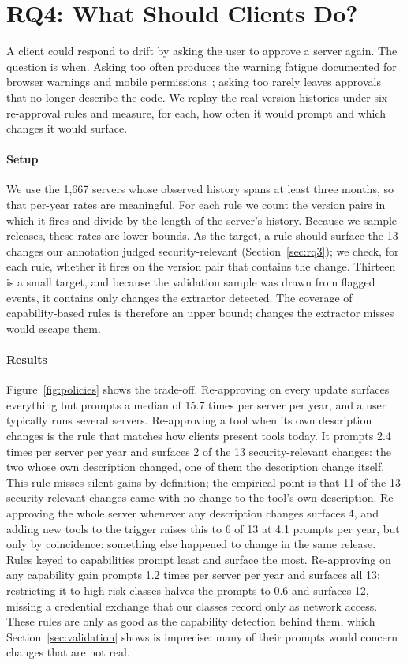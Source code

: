 \section{RQ4: What Should Clients Do?}\label{sec:rq4}

A client could respond to drift by asking the user to approve a server again. The question is when. Asking too often produces the warning fatigue documented for browser warnings and mobile permissions~\cite{akhawe2013alice,felt2012android}; asking too rarely leaves approvals that no longer describe the code. We replay the real version histories under six re-approval rules and measure, for each, how often it would prompt and which changes it would surface.

\paragraph{Setup}
We use the 1,667 servers whose observed history spans at least three months, so that per-year rates are meaningful. For each rule we count the version pairs in which it fires and divide by the length of the server's history. Because we sample releases, these rates are lower bounds. As the target, a rule should surface the 13 changes our annotation judged security-relevant (Section~\ref{sec:rq3}); we check, for each rule, whether it fires on the version pair that contains the change. Thirteen is a small target, and because the validation sample was drawn from flagged events, it contains only changes the extractor detected. The coverage of capability-based rules is therefore an upper bound; changes the extractor misses would escape them.

\paragraph{Results}
Figure~\ref{fig:policies} shows the trade-off. Re-approving on every update surfaces everything but prompts a median of 15.7 times per server per year, and a user typically runs several servers. Re-approving a tool when its own description changes is the rule that matches how clients present tools today. It prompts 2.4 times per server per year and surfaces 2 of the 13 security-relevant changes: the two whose own description changed, one of them the description change itself. This rule misses silent gains by definition; the empirical point is that 11 of the 13 security-relevant changes came with no change to the tool's own description. Re-approving the whole server whenever any description changes surfaces 4, and adding new tools to the trigger raises this to 6 of 13 at 4.1 prompts per year, but only by coincidence: something else happened to change in the same release. Rules keyed to capabilities prompt least and surface the most. Re-approving on any capability gain prompts 1.2 times per server per year and surfaces all 13; restricting it to high-risk classes halves the prompts to 0.6 and surfaces 12, missing a credential exchange that our classes record only as network access. These rules are only as good as the capability detection behind them, which Section~\ref{sec:validation} shows is imprecise: many of their prompts would concern changes that are not real.

